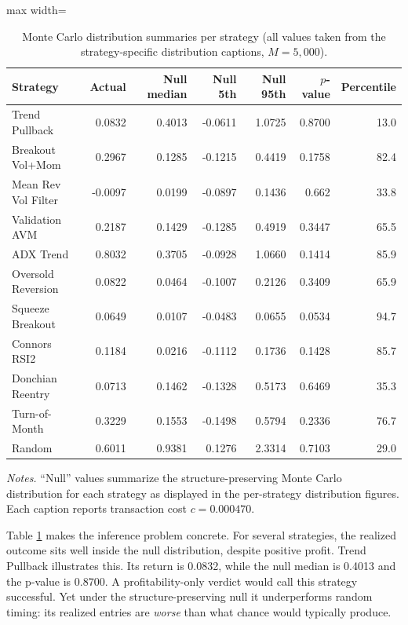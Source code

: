 \documentclass[preprint,12pt]{elsarticle}
\theoremstyle{definition}
\begin{document}
\clearpage
\begin{table}[p]
\centering
\caption{Monte Carlo distribution summaries per strategy (all values taken from the strategy-specific distribution captions, $M=5{,}000$).}
\label{tab:mc}
{\small
\renewcommand{\arraystretch}{1.15}
\setlength{\tabcolsep}{6pt}
\begin{adjustbox}{max width=\textwidth}
\begin{tabular}{@{}lrrrrrr@{}}
\toprule
Strategy & Actual & Null median & Null 5th & Null 95th & $p$-value & Percentile \\
\midrule
Trend Pullback      & 0.0832 & 0.4013 & -0.0611 & 1.0725 & 0.8700 & 13.0 \\
Breakout Vol+Mom    & 0.2967 & 0.1285 & -0.1215 & 0.4419 & 0.1758 & 82.4 \\
Mean Rev Vol Filter & -0.0097 & 0.0199 & -0.0897 & 0.1436 & 0.662\phantom{0} & 33.8 \\
Validation AVM      & 0.2187 & 0.1429 & -0.1285 & 0.4919 & 0.3447 & 65.5 \\
ADX Trend           & 0.8032 & 0.3705 & -0.0928 & 1.0660 & 0.1414 & 85.9 \\
Oversold Reversion  & 0.0822 & 0.0464 & -0.1007 & 0.2126 & 0.3409 & 65.9 \\
Squeeze Breakout    & 0.0649 & 0.0107 & -0.0483 & 0.0655 & 0.0534 & 94.7 \\
Connors RSI2        & 0.1184 & 0.0216 & -0.1112 & 0.1736 & 0.1428 & 85.7 \\
Donchian Reentry    & 0.0713 & 0.1462 & -0.1328 & 0.5173 & 0.6469 & 35.3 \\
Turn-of-Month       & 0.3229 & 0.1553 & -0.1498 & 0.5794 & 0.2336 & 76.7 \\
Random              & 0.6011 & 0.9381 & \phantom{-}0.1276 & 2.3314 & 0.7103 & 29.0 \\
\bottomrule
\end{tabular}
\end{adjustbox}
}
\par\vspace{0.75em}
\begin{minipage}{0.95\textwidth}
\centering
\footnotesize\emph{Notes.} ``Null'' values summarize the structure-preserving Monte Carlo distribution for each strategy as displayed in the per-strategy distribution figures. Each caption reports transaction cost $c=0.000470$.
\end{minipage}
\end{table}
\clearpage

Table \ref{tab:mc} makes the inference problem concrete. For several strategies, the realized outcome sits well inside the null distribution, despite positive profit. Trend Pullback illustrates this. Its return is 0.0832, while the null median is 0.4013 and the p-value is 0.8700. A profitability-only verdict would call this strategy successful. Yet under the structure-preserving null it underperforms random timing: its realized entries are \emph{worse} than what chance would typically produce.
\end{document}
